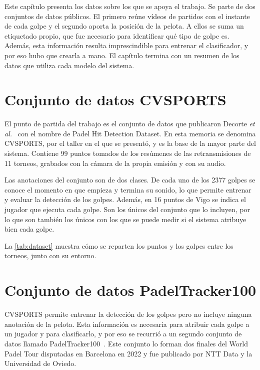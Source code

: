 
Este capítulo presenta los datos sobre los que se apoya el trabajo.
Se parte de dos conjuntos de datos públicos.
El primero reúne vídeos de partidos con el instante de cada golpe y el segundo aporta la posición de la pelota.
A ellos se suma un etiquetado propio, que fue necesario para identificar qué tipo de golpe es.
Además, esta información resulta imprescindible para entrenar el clasificador, y por eso hubo que crearla a mano.
El capítulo termina con un resumen de los datos que utiliza cada modelo del sistema.

\section{Conjunto de datos CVSPORTS}
\label{sec:cvsports}

El punto de partida del trabajo es el conjunto de datos que publicaron Decorte \textit{et al.}~\cite{decorte2024padel} con el nombre de Padel Hit Detection Dataset.
En esta memoria se denomina CVSPORTS, por el taller en el que se presentó, y es la base de la mayor parte del sistema.
Contiene 99 puntos tomados de los resúmenes de las retransmisiones de 11 torneos, grabados con la cámara de la propia emisión y con su audio.

Las anotaciones del conjunto son de dos clases.
De cada uno de los 2377 golpes se conoce el momento en que empieza y termina su sonido, lo que permite entrenar y evaluar la detección de los golpes.
Además, en 16 puntos de Vigo se indica el jugador que ejecuta cada golpe.
Son los únicos del conjunto que lo incluyen, por lo que son también los únicos con los que se puede medir si el sistema atribuye bien cada golpe.

La \cref{tab:dataset} muestra cómo se reparten los puntos y los golpes entre los torneos, junto con su entorno.

\begin{table}[htbp]
  \centering
  \caption{Puntos, golpes y entorno de cada torneo de CVSPORTS.}
  \label{tab:dataset}
  
\end{table}

\section{Conjunto de datos PadelTracker100}
\label{sec:padeltracker}

CVSPORTS permite entrenar la detección de los golpes pero no incluye ninguna anotación de la pelota.
Esta información es necesaria para atribuir cada golpe a un jugador y para clasificarlo, y por eso se recurrió a un segundo conjunto de datos llamado PadelTracker100~\cite{badanerin2026padeltracker100}.
Este conjunto lo forman dos finales del World Padel Tour disputadas en Barcelona en 2022 y fue publicado por NTT Data y la Universidad de Oviedo.

